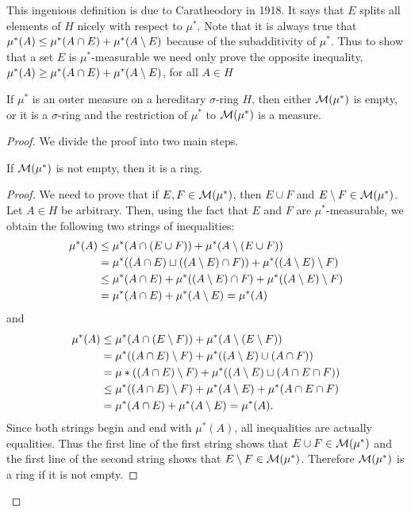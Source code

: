 This ingenious definition is due to Caratheodory in 1918. It says that $E$ splits all elements of $H$ nicely with respect to $\mu^*$. Note that it is always true that $\mu^*(A) \leq \mu^*(A\cap E)+\mu^*(A\setminus E)$ because of the subadditivity of $\mu^*$. Thus to show that a set $E$ is $\mu^*$-measurable we need only prove the opposite inequality, $\mu^*(A)\geq\mu^*(A\cap E)+\mu^*(A\setminus E)$, for all $A\in H$

\begin{theorem}
\label{thm:restriction of outer measure to meas sets}
If $\mu^*$ is an outer measure on a hereditary $\sigma$-ring $H$, then either ${\cal M}(\mu^*)$ is empty, or it is a $\sigma$-ring and the restriction of $\mu^*$ to ${\cal M}(\mu^*)$ is a measure.
\end{theorem}

\begin{proof}

We divide the proof into two main steps.

\begin{lemma}
If ${\cal M}(\mu^*)$ is not empty, then it is a ring.
\end{lemma}
\begin{proof}
We need to prove that if $E,F \in {\cal M}(\mu^*)$, then $E \cup F$ and $E\setminus F\in {\cal M}(\mu^*)$. Let ${A} \in {H}$ be arbitrary. Then, using the fact that $E$ and ${F}$ are $\mu^*$-measurable, we obtain the following two strings of inequalities:
\begin{align*}
    \mu^*(A)&\leq\mu^*(A \cap(E \cup F))+\mu^*(A\setminus(E \cup F)) \\
    &=\mu^*((A \cap E) \sqcup((A\setminus E) \cap F))+\mu^*((A\setminus E)\setminus F) \\
    & \leq \mu^*(A \cap E)+\mu^*((A\setminus E) \cap F)+\mu^*((A\setminus E)\setminus F) \\
    &=\mu^*(A \cap E)+\mu^*(A\setminus E)=\mu^*(A)
\end{align*}
and
\begin{align*}
\mu^*(A) & \leq \mu^*(A \cap(E\setminus F))+\mu^*(A\setminus (E\setminus F)) \\
&=\mu^*((A \cap E)\setminus F)+\mu^*((A\setminus E) \cup(A \cap F)) \\
&=\mu *((A \cap E)\setminus F)+\mu^*((A\setminus E) \sqcup(A \cap E\cap F)) \\
& \leq \mu^*((A \cap E)\setminus F)+\mu^*(A\setminus E)+\mu^*(A \cap E\cap F) \\
&=\mu^*(A \cap E)+\mu^*(A\setminus E)=\mu^*(A) .
\end{align*}
Since both strings begin and end with $\mu^*(A)$, all inequalities are actually equalities. Thus the first line of the first string shows that $E \cup F\in {\cal M}(\mu^*)$ and the first line of the second string shows that $E\setminus F\in {\cal M}(\mu^*)$. Therefore ${\cal M}(\mu^*)$ is a ring if it is not empty.
\end{proof}


\end{proof}

